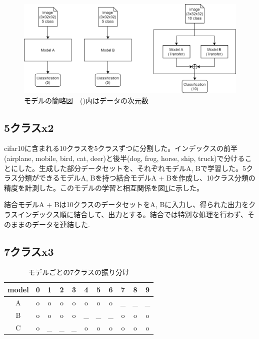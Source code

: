 \documentclass[twocolumn]{jarticle}     %
\begin{document}
\begin{figure}[t]
	\begin{center}
		\includegraphics[clip,width=16cm]{model_figure.png}
		\caption{モデルの簡略図　()内はデータの次元数}
		\label{fig:model}
	\end{center}
\end{figure}

\subsection{5クラスx2}

cifar10に含まれる10クラスを5クラスずつに分割した。インデックスの前半(airplane, mobile, bird, cat, deer)と後半(dog, frog, horse, ship, truck)で分けることにした。生成した部分データセットを、それぞれモデルA, Bで学習した。5クラス分類ができるモデルA, Bを持つ結合モデルA + Bを作成し、10クラス分類の精度を計測した。このモデルの学習と相互関係を図\ref{fig:model}に示した。

結合モデルA + Bは10クラスのデータセットをA, Bに入力し、得られた出力をクラスインデックス順に結合して、出力とする。結合では特別な処理を行わず、そのままのデータを連結した.

\subsection{7クラスx3}

\begin{table}[tb]
  \begin{center}
    \caption{モデルごとの7クラスの振り分け}
    \begin{tabular}{|c||c|c|c|c|c|c|c|c|c|c|} \hline
      model & 0 & 1 & 2 & 3 & 4 & 5 & 6 & 7 & 8 & 9 \\ \hline\hline
      A     & o & o & o & o & o & o & o & _ & _ & _ \\ \hline
      B     & o & o & o & o & _ & _ & _ & o & o & o \\ \hline
      C     & o & _ & _ & _ & o & o & o & o & o & o \\ \hline
    \end{tabular}
    \label{tab:class7}
  \end{center}
\end{table}
\end{document}
